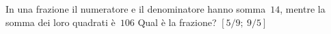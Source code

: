 \begin{multicols}{2}
\begin{esercizio}[\Ast]
 \label{ese:3.127}
In una frazione il numeratore e il denominatore hanno somma~$14$, mentre la
somma dei loro quadrati è~$106$ Qual è la frazione?
\hfill$\left[5/9;~9/5\right]$
\end{esercizio}
% 
% 
% 
% 
% 

\end{multicols}
